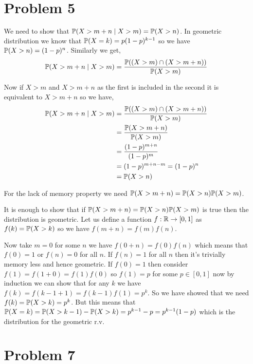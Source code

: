 \documentclass[a4paper]{report}
\begin{document}
\section*{Problem 5}

We need to show that $\P(X > m + n \mid X > m) = \P(X > n)$. In geometric distribution we know that  $\P(X = k) = p(1 - p)^{k - 1}$ so we have $\P(X > n) = (1 - p)^{n}$. Similarly we get, 
\begin{align*}
	\P(X > m + n \mid X > m) = \frac{\P((X > m) \cap (X > m + n))}{\P(X > m)}
\end{align*}

Now if $X > m$ and  $X > m + n$ as the first is included in the second it is equivalent to  $X > m + n$ so we have,  
\begin{align*}
	\P(X > m + n \mid X > m) &= \frac{\P((X > m) \cap (X > m + n))}{\P(X > m)}\\
				 &=  \frac{\P(X > m + n)}{\P(X > m)}\\
				 &= \frac{(1 - p)^{m + n}}{(1 - p)^{m}}\\
				 &= (1 - p)^{m + n - m} = (1 - p)^{n}\\
				 &= \P(X > n)
\end{align*}

For the lack of memory property we need $\P(X > m + n) = \P(X > n) \P(X > m)$.

\vspace{1em}

It is enough to show that if  $\P(X > m + n) = \P(X > n) \P(X > m)$ is true then the distribution is geometric. Let us define a function $f:\R \to [0,1]$ as $f(k) = \P(X > k)$ so we have $f(m + n)= f(m)f(n)$.

\vspace{1em}

Now take $m = 0$ for some $n$ we have $f(0 + n) = f(0) f(n)$ which means that $f(0) = 1$ or $f(n) = 0$ for all $n$. If $f(n) = 1$ for all $n$ then it's trivially memory less and hence geometric. If $f(0) = 1$ then consider $f(1) = f(1 + 0) = f(1) f(0)$ so $f(1) = p$ for some $p \in [0, 1]$ now by induction we can show that for any $k$ we have $f(k) = f(k - 1 + 1) = f(k - 1) f(1) = p^{k}$. So we have showed that we need $f(k) = \P(X > k) = p^{k}$. But this means that $\P(X = k) = \P(X > k - 1) - \P(X > k ) = p^{k - 1} - p = p^{k - 1}( 1- p)$ which is the distribution for the geometric r.v.


\section*{Problem 7}
\end{document}
